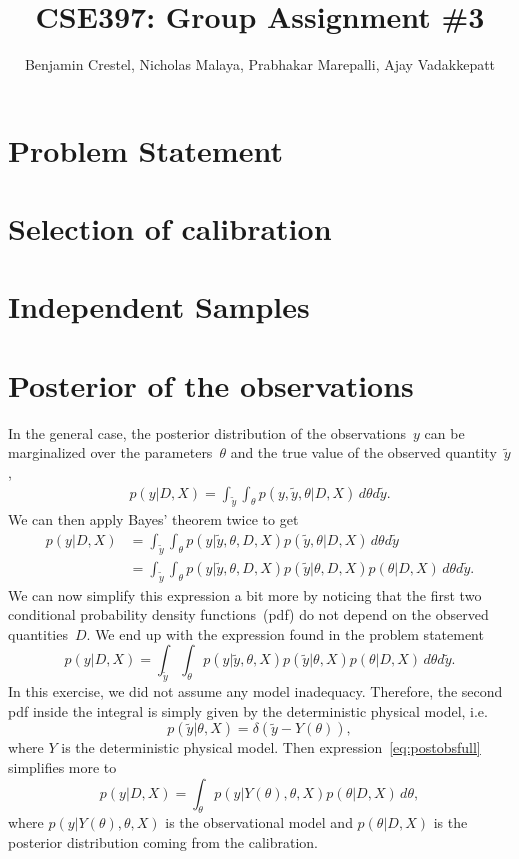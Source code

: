 \documentclass{article}
\title{\bf{CSE397: Group Assignment \#3}}
\author{Benjamin Crestel, Nicholas Malaya, Prabhakar Marepalli, Ajay Vadakkepatt}
\date{}
\begin{document}
\maketitle

\newpage
\section*{Problem Statement}

\section{Selection of calibration}

\section{Independent Samples}

\section{Posterior of the observations}
In the general case, the posterior distribution of the observations~$y$ can be marginalized over the parameters~$\theta$ and the true value of the observed quantity~$\tilde{y}$,
\begin{align*}
p( y | D, X)  = \int_{\tilde{y}} \int_\theta p(y, \tilde{y}, \theta | D, X) \, d\theta d\tilde{y} .
\end{align*}
We can then apply Bayes' theorem twice to get 
\begin{align*}
p( y | D, X) & = \int_{\tilde{y}} \int_\theta p(y | \tilde{y}, \theta , D, X) p(\tilde{y}, \theta | D, X) \, d\theta d\tilde{y}  \\
 & = \int_{\tilde{y}} \int_\theta p(y | \tilde{y}, \theta , D, X) p(\tilde{y} | \theta , D, X) p(\theta | D, X) \, d\theta d\tilde{y} .
\end{align*}
We can now simplify this expression a bit more by noticing that the first two conditional probability density functions~(pdf) do not depend on the observed quantities~$D$.
We end up with the expression found in the problem statement
\begin{equation} \label{eq:postobsfull}
 p( y | D, X)  = \int_{\tilde{y}} \int_\theta p(y | \tilde{y}, \theta , X) p(\tilde{y} | \theta , X) p(\theta | D, X) \, d\theta d\tilde{y} . 
\end{equation}
In this exercise, we did not assume any model inadequacy.
Therefore, the second pdf inside the integral is simply given by the deterministic physical model, i.e.
\[ p( \tilde{y} | \theta, X) = \delta(\tilde{y} - Y(\theta)) , \]
where $Y$ is the deterministic physical model.
Then expression~\ref{eq:postobsfull} simplifies more to
\begin{equation} \label{eq:postobs}
 p( y | D, X)  = \int_{\theta} p(y | Y(\theta), \theta , X) p(\theta | D, X) \, d\theta ,
\end{equation}
where $p(y | Y(\theta), \theta , X)$ is the observational model and $p(\theta | D, X)$ is the posterior distribution coming from the calibration.
\end{document}
